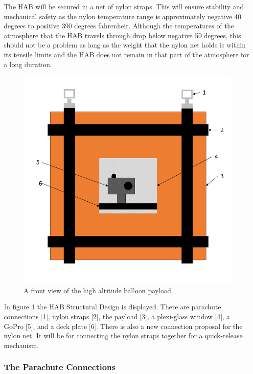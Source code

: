 \documentclass[journal]{SPEXformat}
\begin{document}
  The HAB will be secured in a net of nylon straps. This will ensure stability and mechanical safety as the nylon
  temperature range is approximately negative 40 degrees to positive 390 degrees fahrenheit. Although the temperatures of the atmosphere that the HAB
  travels through drop below negative 50 degrees, this should not be a problem as long as the weight that the nylon
  net holds is within its tensile limits and the HAB does not remain in that part of the atmosphere for a long
  duration.
\begin{figure}
  \includegraphics[width = \linewidth]{figs/HAB-Strap-Fig.png}
  \caption{A front view of the high altitude balloon payload.}
  \label{fig:HAB Front View}
\end{figure}

  In figure 1 the HAB Structural Design is displayed. There are parachute connections [1], nylon straps
  [2], the payload [3], a plexi-glass window [4], a GoPro [5], and a deck plate [6]. There is also a new connection
  proposal for the nylon net. It will be for connecting the nylon straps together for a quick-release mechanism.
\subsubsection{The Parachute Connections}
\label{subsubsec: the parachute connections}
\end{document}
